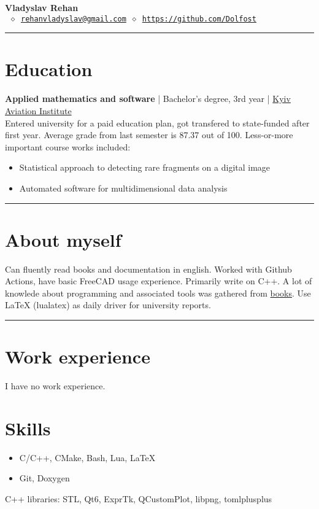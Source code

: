 


\newcommand{\crule}{\par\noindent\rule{\textwidth}{0.5pt}}


\thispagestyle{empty}

\begin{center}
	\LARGE \textbf{Vladyslav Rehan}\\[4mm] \normalsize
	\texttt{ \(\diamond\)\
	\href{mailto:rehanvladyslav@gmail.com}{rehanvladyslav@gmail.com} \(\diamond\)
	\url{https://github.com/Dolfost}}
\end{center}
\crule
\section{Education}
\textbf{Applied mathematics and software} | Bachelor's degree, 3rd year | \href{http://nau.edu.ua/en/}{Kyiv Aviation Institute}\\
Entered university for a paid education plan, got transfered to state-funded
after first year. Average grade from last semester is 87.37 out of 100.
Less-or-more important course works included:
\begin{itemize}
	\item Statistical approach to detecting rare fragments on a digital image
	\item Automated software for multidimensional data analysis
\end{itemize}

\crule
\section{About myself}
Can fluently read books and documentation in english. Worked with Github
Actions, have basic FreeCAD usage experience. Primarily write on C++. A lot of
knowlede about programming and associated tools was gathered from
\href{https://github.com/Dolfost/Dolfost/blob/main/README.md#literature--sources}{books}.
Use LaTeX (lualatex) as daily driver for university reports.

\crule
\section{Work experience}
I have no work experience.

\section{Skills}
\begin{itemize}
	\item C/C++, CMake, Bash, Lua, LaTeX
	\item Git, Doxygen
\end{itemize}
C++ libraries: STL, Qt6, ExprTk, QCustomPlot, libpng, tomlplusplus

